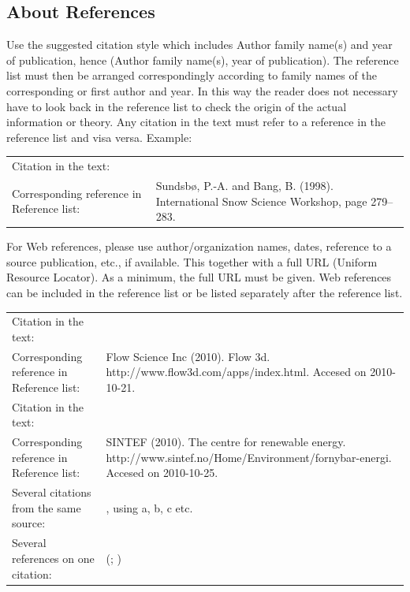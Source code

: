 \documentclass[a4paper,12pt]{extarticle}
\begin{document}
\subsection{About References}
Use the suggested citation style which includes Author family name(s) and year of publication, hence (Author family name(s), year of publication). The reference list must then be arranged correspondingly according to family names of the corresponding or first author and year. In this way the reader does not necessary have to look back in the reference list to check the origin of the actual information or theory. Any citation in the text must refer to a reference in the reference list and visa versa. Example:

\begin{table}[H]
  \footnotesize
  \begin{tabulary}{\textwidth}{lL}
    Citation in the text: & \citep{Sundsbo1998}\\
    Corresponding reference in Reference list: & Sundsbø, P.-A. and Bang, B. (1998). International Snow Science Workshop, page 279–283.
  \end{tabulary}
\end{table}

For Web references, please use author/organization names, dates, reference to a source publication, etc., if available. This together with a full URL (Uniform Resource Locator). As a minimum, the full URL must be given. Web references can be included in the reference list or be listed separately after the reference list.
\begin{table}[H]
  \footnotesize
  \begin{tabulary}{\textwidth}{lL}
    Citation in the text: & \citep{FlowScienceInc2010} \\
    Corresponding reference in Reference list: & Flow Science Inc (2010). Flow 3d. http://www.flow3d.com/apps/index.html. Accesed on 2010-10-21. \\
    Citation in the text: & \citep{SINTEF2010}\\
    Corresponding reference in Reference list: & SINTEF (2010). The centre for renewable energy. http://www.sintef.no/Home/Environment/fornybar-energi. Accesed on 2010-10-25.\\
    Several citations from the same source: & \citep[a]{SINTEF2010}, using a, b, c etc.\\
    Several references on one citation: & (\citep{SINTEF2010}; \citep{FlowScienceInc2010})
  \end{tabulary}
\end{table}
\end{document}
